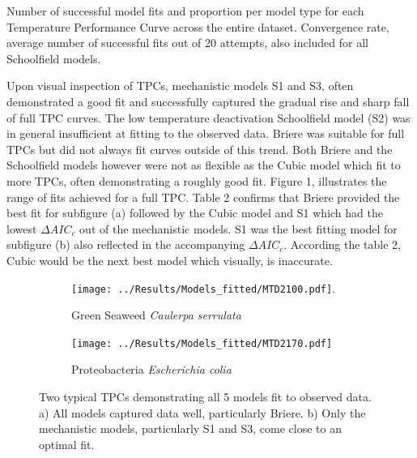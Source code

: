 \documentclass[12pt]{article}
\begin{document}
\begin{linenumbers}
\begin{table}[H]
\FloatBarrier
\centering
\caption{Number of successful model fits and proportion per model type for each Temperature Performance Curve across the entire dataset. Convergence rate, average number of successful fits out of 20 attempts, also included for all Schoolfield models.}
\begin{adjustbox}{height = 1.7cm, width=11cm}
\centering
 
\FloatBarrier
\end{adjustbox}
\end{table} 

Upon visual inspection of TPCs, mechanistic models S1 and S3, often demonstrated a good fit and successfully captured the gradual rise and sharp fall of full TPC curves. The low temperature deactivation Schoolfield model (S2) was in general insufficient at fitting to the observed data. Briere was suitable for full TPCs but did not always fit curves outside of this trend. Both Briere and the Schoolfield models however were not as flexible as the Cubic model which fit to more TPCs, often demonstrating a roughly good fit. Figure 1, illustrates the range of fits achieved for a full TPC. Table 2 confirms that Briere provided the best fit for subfigure (a) followed by the Cubic model and S1 which had the lowest \(\Delta AIC_c\) out of the mechanistic models. S1 was the best fitting model for subfigure (b) also reflected in the accompanying \(\Delta AIC_c\). According the table 2, Cubic would be the next best model which visually, is inaccurate.

\begin{figure}[H]
	\centering
	\begin{subfigure}{0.5\textwidth}
		\centering
		\texttt{[image: ../Results/Models\_fitted/MTD2100.pdf]}.
		\caption{Green Seaweed \textit{Caulerpa serrulata} }
		\label{fig:sub1}
	\end{subfigure}%
	\begin{subfigure}{0.5\textwidth}
		\centering
		\texttt{[image: ../Results/Models\_fitted/MTD2170.pdf]}
		\caption{ Proteobacteria \textit{Escherichia colia}}
		\label{fig:sub2}
	\end{subfigure}
	\caption{Two typical TPCs demonstrating all 5 models fit to observed data. a) All models captured data well, particularly Briere. b) Only the mechanistic models, particularly S1	and S3, come close to an optimal fit.}
	\label{fig:test}
\end{figure}




\end{linenumbers}
\end{document}
